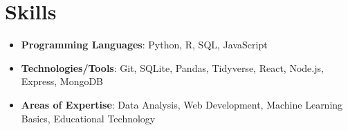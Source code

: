 \documentclass[11pt, a4paper]{article}
\begin{document}
\section*{Skills}
\begin{itemize}[leftmargin=*]
  \item[] \textbf{Programming Languages}: Python, R, SQL, JavaScript
  \item[] \textbf{Technologies/Tools}: Git, SQLite, Pandas, Tidyverse, React, Node.js, Express, MongoDB
  \item[] \textbf{Areas of Expertise}: Data Analysis, Web Development, Machine Learning Basics, Educational Technology
\end{itemize}
\end{document}
